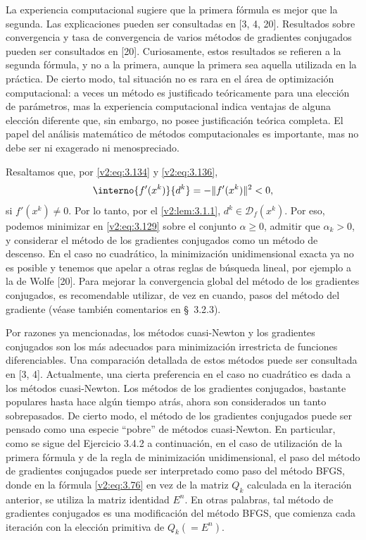 La experiencia computacional sugiere que la primera fórmula es mejor que la segunda. Las explicaciones pueden ser consultadas en [3, 4, 20]. Resultados sobre convergencia y tasa de convergencia de varios métodos de gradientes conjugados pueden ser consultados en [20]. Curiosamente, estos resultados se refieren a la segunda fórmula, y no a la primera, aunque la primera sea aquella utilizada en la práctica. De cierto modo, tal situación no es rara en el área de optimización computacional: a veces un método es justificado teóricamente para una elección de parámetros, mas la experiencia computacional indica ventajas de alguna elección diferente que, sin embargo, no posee justificación teórica completa. El papel del análisis matemático de métodos computacionales es importante, mas no debe ser ni exagerado ni menospreciado.

Resaltamos que, por \eqref{v2:eq:3.134} y \eqref{v2:eq:3.136},
\[
    \interno{f'(x^k)}{d^k} = -\|f'(x^k)\|^2 < 0,
\]
si $f'(x^k) \neq 0$. Por lo tanto, por el \cref{v2:lem:3.1.1}, $d^k \in \mathcal{D}_f(x^k)$. Por eso, podemos minimizar en \eqref{v2:eq:3.129} sobre el conjunto $\alpha \ge 0$, admitir que $\alpha_k > 0$, y considerar el método de los gradientes conjugados como un método de descenso. En el caso no cuadrático, la minimización unidimensional exacta ya no es posible y tenemos que apelar a otras reglas de búsqueda lineal, por ejemplo a la de Wolfe [20]. Para mejorar la convergencia global del método de los gradientes conjugados, es recomendable utilizar, de vez en cuando, pasos del método del gradiente (véase también comentarios en \S~3.2.3).

Por razones ya mencionadas, los métodos cuasi-Newton y los gradientes conjugados son los más adecuados para minimización irrestricta de funciones diferenciables. Una comparación detallada de estos métodos puede ser consultada en [3, 4]. Actualmente, una cierta preferencia en el caso no cuadrático es dada a los métodos cuasi-Newton. Los métodos de los gradientes conjugados, bastante populares hasta hace algún tiempo atrás, ahora son considerados un tanto sobrepasados. De cierto modo, el método de los gradientes conjugados puede ser pensado como una especie ``pobre'' de métodos cuasi-Newton. En particular, como se sigue del Ejercicio 3.4.2 a continuación, en el caso de utilización de la primera fórmula y de la regla de minimización unidimensional, el paso del método de gradientes conjugados puede ser interpretado como paso del método BFGS, donde en la fórmula \eqref{v2:eq:3.76} en vez de la matriz $Q_k$ calculada en la iteración anterior, se utiliza la matriz identidad $E^n$. En otras palabras, tal método de gradientes conjugados es una modificación del método BFGS, que comienza cada iteración con la elección primitiva de $Q_k(= E^n)$.
